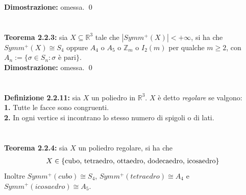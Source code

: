 \documentclass{article}
\begin{document}
\textbf{Dimostrazione:} omessa. \qed \\ \\ \\
\textbf{Teorema 2.2.3:} sia $X \subseteq \mathbb{R}^3$ tale che $|Symm^+(X)| < +\infty$, si ha che $Symm^+(X) \cong S_4$ oppure $A_4$ o $A_5$ o $\mathbb{Z}_m$ o $I_2(m)$ per qualche $m \geq 2$, con $A_n := \{ \sigma \in S_n : \sigma \text{ è pari} \}$. \\

\textbf{Dimostrazione:} omessa. \qed \\ \\ \\
\textbf{Definizione 2.2.11:} sia $X$ un poliedro in $\mathbb{R}^3$. $X$ è detto \textit{regolare} se valgono: \\
\textbf{1.} Tutte le facce sono congruenti. \\
\textbf{2.} In ogni vertice si incontrano lo stesso numero di spigoli o di lati. \\ \\ \\
\textbf{Teorema 2.2.4:} sia $X$ un poliedro regolare, si ha che
\begin{gather}
    X \in \{ \text{cubo, tetraedro, ottaedro, dodecaedro, icosaedro} \} \notag
\end{gather}
Inoltre $Symm^+(cubo) \cong S_4$, $Symm^+(tetraedro) \cong A_4$ e $Symm^+(icosaedro) \cong A_5$. \\
\end{document}
